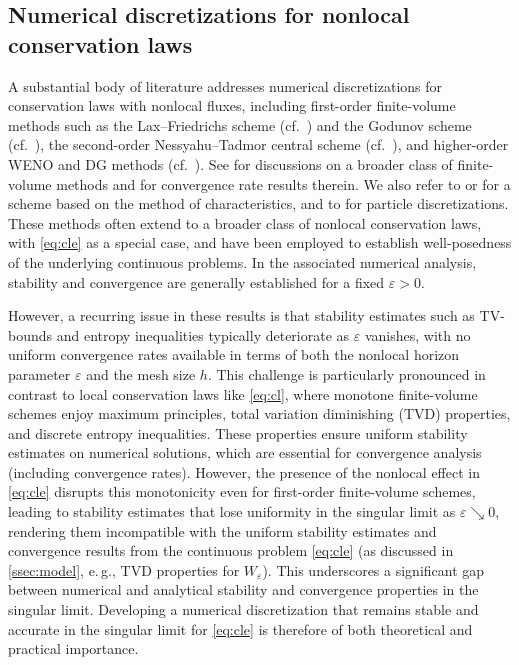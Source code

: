 \documentclass[10pt]{amsart}
\theoremstyle{plain}
\theoremstyle{definition}
\numberwithin{equation}{section}
\newcommand{\eps}{{\varepsilon}}
\begin{document}
\subsection{Numerical discretizations for nonlocal conservation laws}
\label{ssec:numerical-history}

A substantial body of literature addresses numerical discretizations for conservation laws with nonlocal fluxes, including first-order finite-volume methods such as the Lax--Friedrichs scheme (cf.~\cite{MR3342191,MR3447130,aggarwal2015nonlocal,chiarello2018global}) and the Godunov scheme (cf.~\cite{MR3917881}), the second-order Nessyahu--Tadmor central scheme (cf.~\cite{kurganov2009non,betancourt2011nonlocal,goatin2016well}), and higher-order WENO and DG methods (cf.~\cite{MR3759879,MR3934112}). See \cite{JF2023,MR4742183} for discussions on a broader class of finite-volume methods and \cite{MR4700412,MR4839139} for convergence rate results therein.
We also refer to \cite[Chapter~3]{Pflug2018} or \cite[Section~5]{KEIMER2023} for a scheme based on the method of characteristics, and to \cite{chiarello2020micro,ridder2019traveling,goatin2017traffic,radici2021entropysolutionsnonlocalscalar,DiFrancesco2025,MR3356989,MR3906267} for particle discretizations.
These methods often extend to a broader class of nonlocal conservation laws, with \cref{eq:cle} as a special case, and have been employed to establish well-posedness of the underlying continuous problems. In the associated numerical analysis, stability and convergence are generally established for a fixed $\eps>0$.

However, a recurring issue in these results is that stability estimates such as TV-bounds and entropy inequalities typically deteriorate as $\varepsilon$ vanishes, with no uniform convergence rates available in terms of both the nonlocal horizon parameter $\varepsilon$ and the mesh size $h$. This challenge is particularly pronounced in contrast to local conservation laws like \cref{eq:cl}, where monotone finite-volume schemes enjoy maximum principles, total variation diminishing (TVD) properties, and discrete entropy inequalities. These properties ensure uniform stability estimates on numerical solutions, which are essential for convergence analysis (including convergence rates). However, the presence of the nonlocal effect in \cref{eq:cle} disrupts this monotonicity even for first-order finite-volume schemes, leading to stability estimates that lose uniformity in the singular limit as $\varepsilon \searrow 0$, rendering them incompatible with the uniform stability estimates and convergence results from the continuous problem \cref{eq:cle} (as discussed in \cref{ssec:model}, e.\,g., TVD properties for $W_\varepsilon$). 
This underscores a significant gap between numerical and analytical stability and convergence properties in the singular limit.
Developing a numerical discretization that remains stable and accurate in the singular limit for \cref{eq:cle} is therefore of both theoretical and practical importance.
\end{document}
